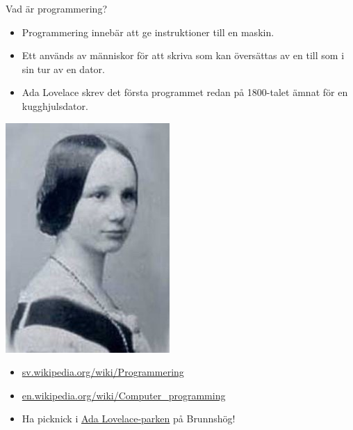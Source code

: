 \begin{Slide}{Vad är programmering?}
\begin{itemize}
\item Programmering innebär att ge instruktioner till en maskin.
\item Ett  används av människor för att skriva  som kan översättas av en  till  som i sin tur  av en dator.
\end{itemize}


\begin{minipage}{.8\textwidth}
\begin{itemize}
\item Ada Lovelace skrev det första programmet redan på 1800-talet ämnat för en kugghjulsdator.
\end{itemize}
\end{minipage}%
\begin{minipage}{.2\textwidth}
\centering\includegraphics[width=0.6\columnwidth]{../img/ada}
\end{minipage}%
\begin{itemize}
\item \href{https://sv.wikipedia.org/wiki/Programmering}{sv.wikipedia.org/wiki/Programmering}
\item \href{https://en.wikipedia.org/wiki/Computer\_programming}{en.wikipedia.org/wiki/Computer\_programming}
\item Ha picknick i \href{http://kartor.lund.se/wiki/lundanamn/index.php/Ada_Lovelace-parken}{Ada Lovelace-parken} på Brunnshög!
\end{itemize}
\end{Slide}


